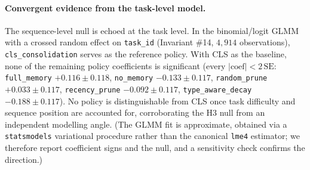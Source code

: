 \paragraph{Convergent evidence from the task-level model.}
The sequence-level null is echoed at the task level. In the binomial/logit GLMM with a
crossed random effect on \texttt{task\_id} (Invariant \#14, $4{,}914$ observations),
\texttt{cls\_consolidation} serves as the reference policy. With CLS as the baseline, none
of the remaining policy coefficients is significant (every $|\text{coef}| < 2\,\mathrm{SE}$:
\texttt{full\_memory} $+0.116 \pm 0.118$, \texttt{no\_memory} $-0.133 \pm 0.117$,
\texttt{random\_prune} $+0.033 \pm 0.117$, \texttt{recency\_prune} $-0.092 \pm 0.117$,
\texttt{type\_aware\_decay} $-0.188 \pm 0.117$). No policy is distinguishable from CLS once
task difficulty and sequence position are accounted for, corroborating the H3 null from an
independent modelling angle. (The GLMM fit is approximate, obtained via a
\texttt{statsmodels} variational procedure rather than the canonical \texttt{lme4}
estimator; we therefore report coefficient signs and the null, and a sensitivity check
confirms the direction.)
